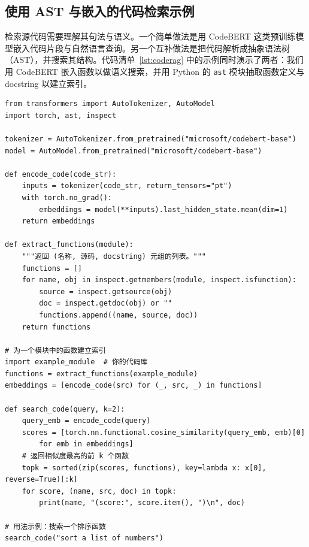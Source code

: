 \subsection{使用 AST 与嵌入的代码检索示例}

检索源代码需要理解其句法与语义。一个简单做法是用 CodeBERT \citep{feng2020codebert} 这类预训练模型嵌入代码片段与自然语言查询。另一个互补做法是把代码解析成抽象语法树（AST），并搜索其结构。代码清单~\ref{lst:coderag} 中的示例同时演示了两者：我们用 CodeBERT 嵌入函数以做语义搜索，并用 Python 的 \texttt{ast} 模块抽取函数定义与 docstring 以建立索引。


\begin{listing}[!ht]
\begin{verbatim}
from transformers import AutoTokenizer, AutoModel
import torch, ast, inspect

tokenizer = AutoTokenizer.from_pretrained("microsoft/codebert-base")
model = AutoModel.from_pretrained("microsoft/codebert-base")

def encode_code(code_str):
    inputs = tokenizer(code_str, return_tensors="pt")
    with torch.no_grad():
        embeddings = model(**inputs).last_hidden_state.mean(dim=1)
    return embeddings

def extract_functions(module):
    """返回 (名称, 源码, docstring) 元组的列表。"""
    functions = []
    for name, obj in inspect.getmembers(module, inspect.isfunction):
        source = inspect.getsource(obj)
        doc = inspect.getdoc(obj) or ""
        functions.append((name, source, doc))
    return functions

# 为一个模块中的函数建立索引
import example_module  # 你的代码库
functions = extract_functions(example_module)
embeddings = [encode_code(src) for (_, src, _) in functions]

def search_code(query, k=2):
    query_emb = encode_code(query)
    scores = [torch.nn.functional.cosine_similarity(query_emb, emb)[0] 
        for emb in embeddings]
    # 返回相似度最高的前 k 个函数
    topk = sorted(zip(scores, functions), key=lambda x: x[0], reverse=True)[:k]
    for score, (name, src, doc) in topk:
        print(name, "(score:", score.item(), ")\n", doc)

# 用法示例：搜索一个排序函数
search_code("sort a list of numbers")
\end{verbatim}
\caption{Python 中基于代码的检索示例}
\label{lst:coderag}
\end{listing}

